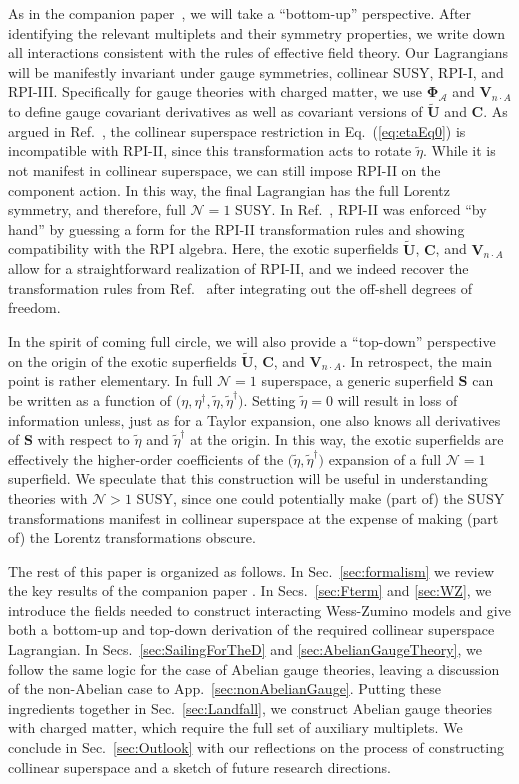 \documentclass[12pt,document,nofootinbib,superscriptaddress,onecolumn,preprintnumbers,balancelastpage]{article}
\DeclareRobustCommand{\Sec}[1]{Sec.~\ref{#1}}
\DeclareRobustCommand{\Secs}[2]{Secs.~\ref{#1} and \ref{#2}}
\DeclareRobustCommand{\App}[1]{App.~\ref{#1}}
\DeclareRobustCommand{\Eq}[1]{Eq.~(\ref{#1})}
\DeclareRobustCommand{\Ref}[1]{Ref.~\cite{#1}}
\newcommand{\bS}{ \boldsymbol S}
\newcommand{\bC}{ \boldsymbol C}
\newcommand{\bD}{ \boldsymbol{V}_{n \cdot A}}
\newcommand{\bPhialc}{ \boldsymbol{\Phi}_\alc}
\newcommand{\bU}{ \tilde{\boldsymbol U}}
\newcommand{\alc}{\mathcal{A}}
\begin{document}
\begin{spacing}{1.2}
As in the companion paper~\cite{Cohen:2018qvn}, we will take a ``bottom-up'' perspective.
%
After identifying the relevant multiplets and their symmetry properties, we write down all interactions consistent with the rules of effective field theory.
%
Our Lagrangians will be manifestly invariant under gauge symmetries, collinear SUSY, RPI-I, and RPI-III.
%
Specifically for gauge theories with charged matter, we use $\bPhialc$ and $\bD$ to define gauge covariant derivatives as well as covariant versions of $\bU$ and $\bC$. 
%
As argued in \Ref{Cohen:2018qvn}, the collinear superspace restriction in \Eq{eq:etaEq0} is incompatible with RPI-II, since this transformation acts to rotate $\tilde{\eta}$.
%
While it is not manifest in collinear superspace, we can still impose RPI-II on the component action.
%
In this way, the final Lagrangian has the full Lorentz symmetry, and therefore, full $\mathcal{N} = 1$ SUSY.
%
In \Ref{Cohen:2018qvn}, RPI-II was enforced ``by hand'' by guessing a form for the RPI-II transformation rules and showing compatibility with the RPI algebra.
%
Here, the exotic superfields $\bU$, $\bC$, and $\bD$ allow for a straightforward realization of RPI-II, and we indeed recover the transformation rules from \Ref{Cohen:2018qvn}
after integrating out the off-shell degrees of freedom.


In the spirit of coming full circle, we will also provide a ``top-down'' perspective on the origin of the exotic superfields $\bU$, $\bC$, and $\bD$.
%
In retrospect, the main point is rather elementary.
%
In full $\mathcal{N} = 1$ superspace, a generic superfield $\bS$ can be written as a function of $\big(\eta, \eta^\dagger, \tilde{\eta}, \tilde{\eta}^\dagger\big)$.
%
Setting $\tilde{\eta} = 0$ will result in loss of information unless, just as for a Taylor expansion, one also knows all derivatives of $\bS$ with respect to $\tilde{\eta}$ and $\tilde{\eta}^\dagger$ at the origin.
%
In this way, the exotic superfields are effectively the higher-order coefficients of the $\big(\tilde{\eta},\tilde{\eta}^\dagger\big)$ expansion of a full $\mathcal{N} = 1$ superfield.
%
We speculate that this construction will be useful in understanding theories with $\mathcal{N} > 1$ SUSY, since one could potentially make (part of) the SUSY transformations manifest in collinear superspace at the expense of making (part of) the Lorentz transformations obscure.


The rest of this paper is organized as follows.
%
In \Sec{sec:formalism} we review the key results of the companion paper \cite{Cohen:2018qvn}.
%
In \Secs{sec:Fterm}{sec:WZ}, we introduce the fields needed to construct interacting Wess-Zumino models and give both a bottom-up and top-down derivation of the required collinear superspace Lagrangian.
%
In \Secs{sec:SailingForTheD}{sec:AbelianGaugeTheory}, we follow the same logic for the case of Abelian gauge theories, leaving a discussion of the non-Abelian case to \App{sec:nonAbelianGauge}.
%
Putting these ingredients together in \Sec{sec:Landfall}, we construct Abelian gauge theories with charged matter, which require the full set of auxiliary multiplets.
%
We conclude in \Sec{sec:Outlook} with our reflections on the process of constructing collinear superspace and a sketch of future research directions.



\end{spacing}
\end{document}
